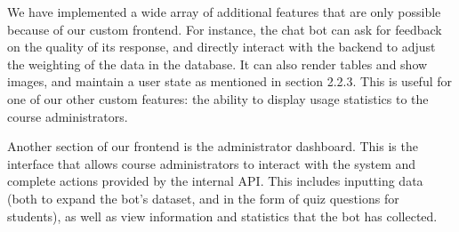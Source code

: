 We have implemented a wide array of additional features that are only possible because of our custom frontend. For instance, the chat bot can ask for feedback on the quality of its response, and directly interact with the backend to adjust the weighting of the data in the database. It can also render tables and show images, and maintain a user state as mentioned in section 2.2.3. This is useful for one of our other custom features: the ability to display usage statistics to the course administrators.

Another section of our frontend is the administrator dashboard. This is the interface that allows course administrators to interact with the system and complete actions provided by the internal API. This includes inputting data (both to expand the bot's dataset, and in the form of quiz questions for students), as well as view information and statistics that the bot has collected.

\newpage
